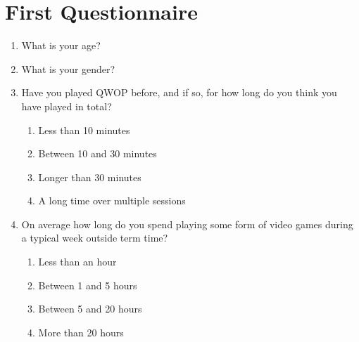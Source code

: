 \documentclass[12pt,a4paper,twoside,openright]{report}
\begin{document}
\section{First Questionnaire}
\label{qs1}
\begin{enumerate}
    \item What is your age?

    \item What is your gender?

    \item Have you played QWOP before, and if so, for how long do you think you have played in total?
      \begin{enumerate}
      \item Less than 10 minutes              
      \item Between 10 and 30 minutes         
      \item Longer than 30 minutes            
      \item A long time over multiple sessions
      \end{enumerate}
    \item On average how long do you spend playing some form of video games during a typical week outside term time?
      \begin{enumerate}
      \item Less than an hour     
      \item Between 1 and 5 hours 
      \item Between 5 and 20 hours
      \item More than 20 hours    
      \end{enumerate}
\end{enumerate}
\end{document}
